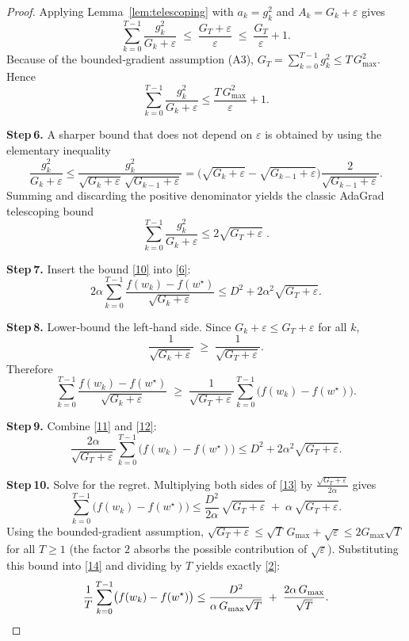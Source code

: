 \documentclass{article}
\begin{document}
\begin{proof}
Applying Lemma~\ref{lem:telescoping} with $a_{k}=g_{k}^{2}$ and $A_{k}=G_{k}+\varepsilon$ gives
\[
\sum_{k=0}^{T-1}\frac{g_{k}^{2}}{G_{k}+\varepsilon}
\;\le\;
\frac{G_{T}+\varepsilon}{\varepsilon}
\;\le\;
\frac{G_{T}}{\varepsilon}+1 .
\tag{8}
\]
Because of the bounded‑gradient assumption (A3),
$G_{T}=\sum_{k=0}^{T-1}g_{k}^{2}\le T\,G_{\max}^{2}$.  Hence
\[
\sum_{k=0}^{T-1}\frac{g_{k}^{2}}{G_{k}+\varepsilon}
\le
\frac{T\,G_{\max}^{2}}{\varepsilon}+1 .
\tag{9}
\]

\noindent\textbf{Step 6.}  A sharper bound that does not depend on $\varepsilon$ is obtained
by using the elementary inequality
\[
\frac{g_{k}^{2}}{G_{k}+\varepsilon}
\le
\frac{g_{k}^{2}}{\sqrt{G_{k}+\varepsilon}\,\sqrt{G_{k-1}+\varepsilon}}
=
\bigl(\sqrt{G_{k}+\varepsilon}-\sqrt{G_{k-1}+\varepsilon}\bigr)
\frac{2}{\sqrt{G_{k-1}+\varepsilon}} .
\]
Summing and discarding the positive denominator yields the classic
AdaGrad telescoping bound
\[
\sum_{k=0}^{T-1}\frac{g_{k}^{2}}{G_{k}+\varepsilon}
\le
2\sqrt{G_{T}+\varepsilon}\; .
\tag{10}
\]

\noindent\textbf{Step 7.}  Insert the bound \eqref{10} into \eqref{6}:
\[
2\alpha\sum_{k=0}^{T-1}
\frac{f(w_{k})-f(w^{\star})}{\sqrt{G_{k}+\varepsilon}}
\le
D^{2}+2\alpha^{2}\sqrt{G_{T}+\varepsilon}.
\tag{11}
\]

\noindent\textbf{Step 8.}  Lower‑bound the left‑hand side.
Since $G_{k}+\varepsilon\le G_{T}+\varepsilon$ for all $k$,
\[
\frac{1}{\sqrt{G_{k}+\varepsilon}}
\;\ge\;
\frac{1}{\sqrt{G_{T}+\varepsilon}} .
\]
Therefore
\[
\sum_{k=0}^{T-1}
\frac{f(w_{k})-f(w^{\star})}{\sqrt{G_{k}+\varepsilon}}
\;\ge\;
\frac{1}{\sqrt{G_{T}+\varepsilon}}
\sum_{k=0}^{T-1}\bigl(f(w_{k})-f(w^{\star})\bigr).
\tag{12}
\]

\noindent\textbf{Step 9.}  Combine \eqref{11} and \eqref{12}:
\[
\frac{2\alpha}{\sqrt{G_{T}+\varepsilon}}
\sum_{k=0}^{T-1}\bigl(f(w_{k})-f(w^{\star})\bigr)
\le
D^{2}+2\alpha^{2}\sqrt{G_{T}+\varepsilon}.
\tag{13}
\]

\noindent\textbf{Step 10.}  Solve for the regret.
Multiplying both sides of \eqref{13} by $\frac{\sqrt{G_{T}+\varepsilon}}{2\alpha}$ gives
\[
\sum_{k=0}^{T-1}\bigl(f(w_{k})-f(w^{\star})\bigr)
\le
\frac{D^{2}}{2\alpha}\,\sqrt{G_{T}+\varepsilon}
\;+\;
\alpha\,\sqrt{G_{T}+\varepsilon}.
\tag{14}
\]
Using the bounded‑gradient assumption,
$\sqrt{G_{T}+\varepsilon}\le\sqrt{T}\,G_{\max}+\sqrt{\varepsilon}
\le 2G_{\max}\sqrt{T}$ for all $T\ge1$ (the factor $2$ absorbs the
possible contribution of $\sqrt{\varepsilon}$).  Substituting this bound
into \eqref{14} and dividing by $T$ yields exactly \eqref{2}:
\[
\frac{1}{T}\sum_{k=0}^{T-1}\bigl(f(w_{k})-f(w^{\star})\bigr)
\le
\frac{D^{2}}{\alpha\,G_{\max}\sqrt{T}}
\;+\;
\frac{2\alpha\,G_{\max}}{\sqrt{T}} .
\qedhere
\]
\end{proof}
\end{document}
